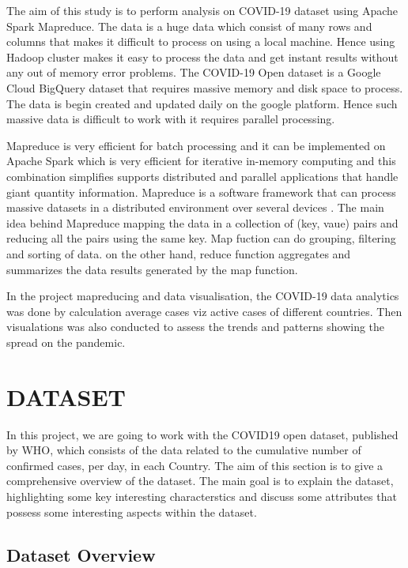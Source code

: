\documentclass[12pt,letterpaper, twoside]{article}
\begin{document}
The aim of this study is to perform analysis on COVID-19 dataset using Apache Spark Mapreduce. The data is a huge data which consist of many rows and columns that makes it difficult to process on using a local machine. Hence using Hadoop cluster makes it easy to process the data and get instant results without any out of memory error problems. The COVID-19 Open dataset is a Google Cloud BigQuery dataset that requires massive memory and disk space to process. The data is begin created and updated daily on the google platform. Hence such massive data is difficult to work with it requires parallel processing. 

Mapreduce is very efficient for batch processing and it can be implemented on Apache Spark which is very efficient for iterative in-memory computing and this combination simplifies supports distributed and parallel applications that handle giant quantity information. Mapreduce is a software framework  that can process massive datasets in a distributed environment over several devices \cite{}. The main idea behind Mapreduce mapping the data in a collection of (key, vaue) pairs and reducing all the pairs using the same key. Map fuction can do grouping, filtering and sorting of data. on the other hand, reduce function aggregates and summarizes the data results generated by the map function. 

In the project mapreducing and data visualisation, the COVID-19 data analytics was done by calculation average cases viz active cases of different countries. Then visualations was also conducted to assess the trends and patterns showing the spread on the pandemic. 

\section{DATASET}
 In this project, we are going to work with the COVID19 open dataset, published by WHO, which consists of the data related to the cumulative number of confirmed cases, per day, in each Country. The aim of this section is to give a comprehensive overview of the dataset. The main goal is to explain the dataset, highlighting some key interesting characterstics and discuss some attributes that possess some interesting aspects  within the dataset.

\subsection{Dataset Overview}
\end{document}
